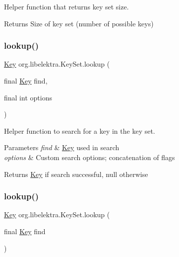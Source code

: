 Helper function that returns key set size. 

\begin{DoxyReturn}{Returns}
Size of key set (number of possible keys) 
\end{DoxyReturn}
\mbox{\label{classorg_1_1libelektra_1_1KeySet_a6fb319a768b1cb43464154a93f9a2e93}} 
\subsubsection{\texorpdfstring{lookup()}{lookup()}\hspace{0.1cm}{\footnotesize\ttfamily [1/4]}}
{\footnotesize\ttfamily \hyperlink{classorg_1_1libelektra_1_1Key}{Key} org.\+libelektra.\+Key\+Set.\+lookup (\begin{DoxyParamCaption}\item[{final \hyperlink{classorg_1_1libelektra_1_1Key}{Key}}]{find,  }\item[{final int}]{options }\end{DoxyParamCaption})\hspace{0.3cm}{\ttfamily [inline]}}



Helper function to search for a key in the key set. 


\begin{DoxyParams}{Parameters}
{\em find} & \hyperlink{classorg_1_1libelektra_1_1Key}{Key} used in search \\
\hline
{\em options} & Custom search options; concatenation of flags \\
\hline
\end{DoxyParams}
\begin{DoxyReturn}{Returns}
\hyperlink{classorg_1_1libelektra_1_1Key}{Key} if search successful, null otherwise 
\end{DoxyReturn}
\mbox{\label{classorg_1_1libelektra_1_1KeySet_a9ff1d475fd6ae316515c4c1cc173991b}} 
\subsubsection{\texorpdfstring{lookup()}{lookup()}\hspace{0.1cm}{\footnotesize\ttfamily [2/4]}}
{\footnotesize\ttfamily \hyperlink{classorg_1_1libelektra_1_1Key}{Key} org.\+libelektra.\+Key\+Set.\+lookup (\begin{DoxyParamCaption}\item[{final \hyperlink{classorg_1_1libelektra_1_1Key}{Key}}]{find }\end{DoxyParamCaption})\hspace{0.3cm}{\ttfamily [inline]}}



